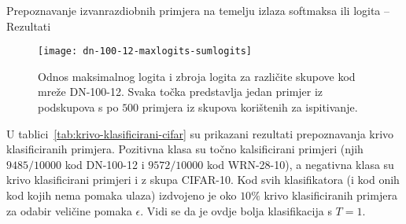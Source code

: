 \documentclass{beamer}
\begin{document}
\begin{frame}[allowframebreaks=0.9]{Prepoznavanje izvanrazdiobnih primjera na temelju izlaza softmaksa ili logita -- Rezultati}
\begin{figure}
	\centering
	\texttt{[image: dn-100-12-maxlogits-sumlogits]}
	\caption{Odnos maksimalnog logita i zbroja logita za različite skupove kod mreže DN-100-12. Svaka točka predstavlja jedan primjer iz podskupova s po $500$ primjera iz skupova korištenih za ispitivanje.}
	\label{fig:dn-100-12-maxlogits-sumlogits}
\end{figure}

U tablici~\ref{tab:krivo-klasificirani-cifar} su prikazani rezultati prepoznavanja krivo klasificiranih primjera. Pozitivna klasa su točno kalsificirani primjeri (njih $9485/10000$ kod DN-100-12 i $9572/10000$ kod WRN-28-10), a negativna klasa su krivo klasificirani primjeri i z skupa CIFAR-10. Kod svih klasifikatora (i kod onih kod kojih nema pomaka ulaza) izdvojeno je oko $10\%$ krivo klasificiranih primjera za odabir veličine	 pomaka $\epsilon$. Vidi se da je ovdje bolja klasifikacija s $T=1$.



\end{frame}
\end{document}

